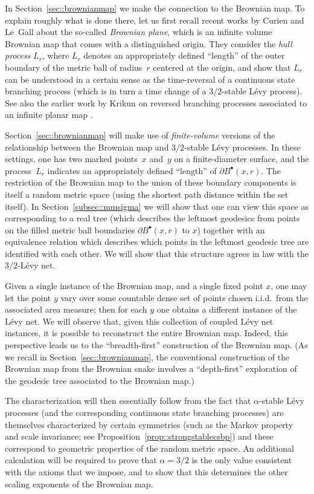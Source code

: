 \documentclass[JEP,XML,SOM,Unicode]{cedram}
\newcommand{\sbullet}{{\scriptscriptstyle\bullet}}
\theoremstyle{plain}
\numberwithin{theorem}{section}
\theoremstyle{definition}
\newcommand{\fb}[2]{B^\sbullet(#1,#2)}
\begin{document}
In Section~\ref{sec::brownianmap} we make the connection to the Brownian map. To explain roughly what is done there, let us first recall recent works by Curien and Le~Gall \cite{cl2014peeling, 2014arXiv1409.4026C} about the so-called \emph{Brownian plane}, which is an infinite volume Brownian map that comes with a distinguished origin. They consider the \emph{hull process} $L_r$, where $L_r$ denotes an appropriately defined ``length'' of the outer boundary of the metric ball of radius~$r$ centered at the origin, and show that $L_r$ can be understood in a certain sense as the time-reversal of a continuous state branching process (which is in turn a time change of a $3/2$-stable Lévy process). See also the earlier work by Krikun on reversed branching processes associated to an infinite planar map \cite{krikun2005uniform}.

Section~\ref{sec::brownianmap} will make use of \emph{finite-volume} versions of the relationship between the Brownian map and $3/2$-stable Lévy processes. In these settings, one has two marked points~$x$ and~$y$ on a finite-diameter surface, and the process~$L_r$ indicates an appropriately defined ``length'' of $\partial \fb{x}{r}$. The restriction of the Brownian map to the union of these boundary components is itself a random metric space (using the shortest path distance within the set itself). In Section~\ref{subsec::mmsigma} we will show that one can view this space as corresponding to a real tree (which describes the leftmost geodesics from points on the filled metric ball boundaries $\partial \fb{x}{r}$ to $x$) together with an equivalence relation which describes which points in the leftmost geodesic tree are identified with each other. We will show that this structure agrees in law with the $3/2$-Lévy net.

Given a single instance of the Brownian map, and a single fixed point $x$, one may let the point $y$ vary over some countable dense set of points chosen i.i.d.\ from the associated area measure; then for each $y$ one obtains a different instance of the Lévy net. We will observe that, given this collection of coupled Lévy net instances, it is possible to reconstruct the entire Brownian map.
Indeed, this perspective leads us to the ``breadth-first'' construction of the Brownian map. (As we recall in Section~\ref{sec::brownianmap}, the conventional construction of the Brownian map from the Brownian snake involves a ``depth-first'' exploration of the geodesic tree associated to the Brownian map.)

The characterization will then essentially follow from the fact that $\alpha$-stable Lévy processes (and the corresponding continuous state branching processes) are themselves characterized by certain symmetries (such as the Markov property and scale invariance; see Proposition~\ref{prop::strongstablecsbp}) and these correspond to geometric properties of the random metric space. An additional calculation will be required to prove that $\alpha = 3/2$ is the only value consistent with the axioms that we impose, and to show that this determines the other scaling exponents of the Brownian map.
\end{document}
